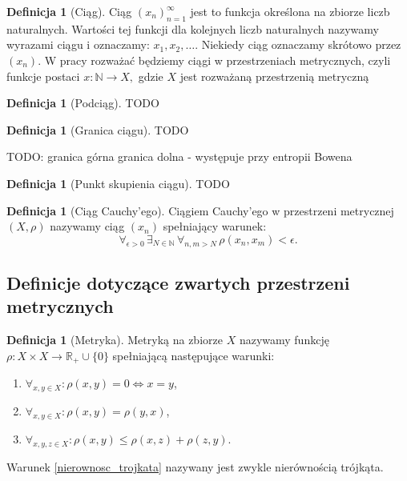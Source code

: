 \documentclass[licencjacka]{pwr_wmat_praca_dyplomowa}
\theoremstyle{plain}
\numberwithin{theorem}{chapter}
\theoremstyle{definition}
\numberwithin{theorem}{chapter}
\newtheorem{definition}[theorem]{Definicja}
\begin{document}
\begin{definition}[Ciąg]
Ciąg $(x_n)_{n=1}^\infty$ jest to funkcja określona na zbiorze liczb naturalnych. Wartości tej funkcji dla kolejnych liczb naturalnych nazywamy wyrazami ciągu i oznaczamy: $x_1, x_2, \ldots$. Niekiedy ciąg oznaczamy skrótowo przez $(x_n)$. W pracy rozważać będziemy ciągi w przestrzeniach metrycznych, czyli funkcje postaci $x: \mathbb{N} \rightarrow X,$ gdzie $X$ jest rozważaną przestrzenią metryczną

\end{definition}

\begin{definition}[Podciąg]
TODO
\end{definition}

\begin{definition}[Granica ciągu]
TODO
\end{definition}

TODO: granica górna granica dolna - występuje przy entropii Bowena

\begin{definition}[Punkt skupienia ciągu]
TODO
\end{definition}

\begin{definition}[Ciąg Cauchy'ego]
Ciągiem Cauchy'ego w przestrzeni metrycznej $(X, \rho)$ nazywamy ciąg $(x_n)$ spełniający warunek:
$$\forall_{\epsilon>0} \, \exists_{N \in \mathbb{N}} \, \forall_{n,m > N} \, \rho(x_n, x_m) < \epsilon.$$
\end{definition}




\subsection{Definicje dotyczące zwartych przestrzeni metrycznych}

\begin{definition}[Metryka]
Metryką na zbiorze $X$ nazywamy funkcję $\rho : X \times X \longrightarrow \mathbb{R}_+ \cup \{0\}$ spełniającą następujące warunki:
\begin{enumerate}
\item $\forall_{x,y \in X}: \rho(x,y)=0 \iff x=y$,
\item $\forall_{x,y \in X}: \rho(x,y) = \rho(y,x)$,
\item \label{nierownosc_trojkata} $\forall_{x,y,z \in X}: \rho(x,y) \leq \rho(x,z) + \rho(z,y)$.
\end{enumerate}
Warunek \ref{nierownosc_trojkata} nazywany jest zwykle nierównością trójkąta.

\end{definition}
\end{document}
